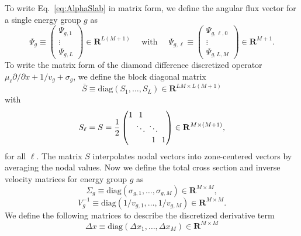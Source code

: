 
To write Eq.~\ref{eq:AlphaSlab} in matrix form, we define the angular flux vector for a single energy group $g$ as
\begin{equation}
\Psi_{g} \equiv 
\begin{pmatrix}
\Psi_{g,1} \\
\vdots \\
\Psi_{g,L}
\end{pmatrix} \in \mathbf{R}^{L(M+1)} \quad \text{ with } \quad
\Psi_{g, \ell} \equiv 
\begin{pmatrix}
\Psi_{g,\ell,0} \\
\vdots \\
\Psi_{g,L,M}
\end{pmatrix} \in \mathbf{R}^{M+1}.
\end{equation}
To write the matrix form of the diamond difference discretized operator $\mu_{\ell} \partial/\partial x + 1/v_{g} + \sigma_{g}$, we define the block diagonal matrix
\begin{equation}
\bar{S} \equiv \text{diag}(S_{1}, \dots, S_{L}) \in \mathbf{R}^{LM \times L(M+1)}
\end{equation}
with
\begin{equation}
S_{\ell} = S = \frac{1}{2}
\setlength\arraycolsep{2pt}
\begin{pmatrix}
1 & 1 & & \\
& \ddots & \ddots & \\
& & 1 & 1
\end{pmatrix} \in \mathbf{R}^{M \times (M+1)},
\end{equation}
for all $\ell$. The matrix $S$ interpolates nodal vectors into zone-centered vectors by averaging the nodal values. Now we define the total cross section and inverse velocity matrices for energy group $g$ as
\begin{equation}
	\Sigma_{g}  \equiv \text{diag}(\sigma_{g,1},\dots,\sigma_{g,M}) \in \mathbf{R}^{M \times M},
\end{equation}
\begin{equation}
	V^{-1}_{g}  \equiv \text{diag}(1/v_{g,1},\dots,1/v_{g,M}) \in \mathbf{R}^{M \times M}.
\end{equation}
We define the following matrices to describe the discretized derivative term
\begin{equation}
	\Delta x \equiv \text{diag}(\Delta x_{1}, \dots, \Delta x_{M}) \in \mathbf{R}^{M \times M}
\end{equation}
